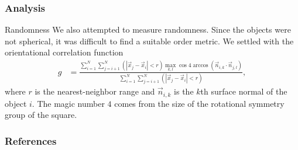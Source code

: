 \documentclass[sumlimits, intlimits]{beamer}
\begin{document}
\begin{frame}
\frametitle{Analysis}
\begin{block}{Randomness}
We also attempted to measure randomness.
Since the objects were not spherical,
it was difficult to find a suitable order metric.
We settled with the orientational correlation function
\begin{align*}
g & = \frac{\sum_{i = 1}^N \sum_{j = i + 1}^N (|\vec x_j - \vec x_i| < r) \max_{k, l} \cos 4 \arccos (\vec n_{i, k} \cdot \vec n_{j, l})}
{\sum_{i = 1}^N \sum_{j = i + 1}^N (|\vec x_j - \vec x_i| < r)},
\end{align*}
where $r$ is the nearest-neighbor range and
$\vec n_{i, k}$ is the $k$th surface normal of the object $i$.
The magic number $4$ comes from the size of the rotational symmetry group of the square.
\end{block}
\end{frame}

\begin{frame}
\frametitle{References}
\printbibliography
\end{frame}
\end{document}
